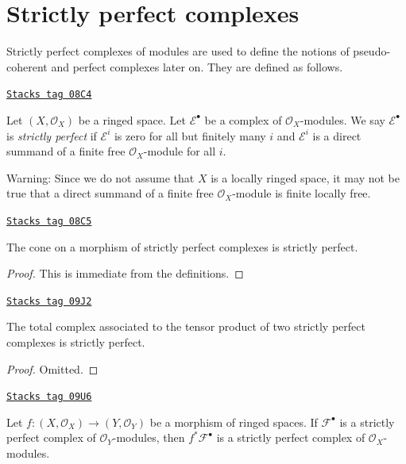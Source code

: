 \section{Strictly perfect complexes}
\label{cohomology-section-strictly-perfect}
Strictly perfect complexes of modules are used to define the notions
of pseudo-coherent and perfect complexes later on. They are defined
as follows.

\begin{definition}
\label{cohomology-definition-strictly-perfect}
\href{https://stacks.math.columbia.edu/tag/08C4}{\texttt{Stacks tag 08C4}}

Let $(X, \mathcal{O}_X)$ be a ringed space.
Let $\mathcal{E}^\bullet$ be a complex of $\mathcal{O}_X$-modules.
We say $\mathcal{E}^\bullet$ is {\it strictly perfect}
if $\mathcal{E}^i$ is zero for all but finitely many $i$ and
$\mathcal{E}^i$ is a direct summand of a finite free
$\mathcal{O}_X$-module for all $i$.
\end{definition}

Warning: Since we do not assume that $X$ is a locally ringed space,
it may not be true that a direct summand of a finite free
$\mathcal{O}_X$-module is finite locally free.

\begin{lemma}[Cone]
\label{cohomology-lemma-cone}
\href{https://stacks.math.columbia.edu/tag/08C5}{\texttt{Stacks tag 08C5}}

The cone on a morphism of strictly perfect complexes is
strictly perfect.
\end{lemma}

\begin{proof}
This is immediate from the definitions.
\end{proof}

\begin{lemma}[Tensor]
\label{cohomology-lemma-tensor}
\href{https://stacks.math.columbia.edu/tag/09J2}{\texttt{Stacks tag 09J2}}

The total complex associated to the tensor product of two
strictly perfect complexes is strictly perfect.
\end{lemma}

\begin{proof}
Omitted.
\end{proof}

\begin{lemma}
\label{cohomology-lemma-strictly-perfect-pullback}
\href{https://stacks.math.columbia.edu/tag/09U6}{\texttt{Stacks tag 09U6}}

Let $f : (X, \mathcal{O}_X) \to (Y, \mathcal{O}_Y)$
be a morphism of ringed spaces. If $\mathcal{F}^\bullet$ is a strictly
perfect complex of $\mathcal{O}_Y$-modules, then
$f^*\mathcal{F}^\bullet$ is a strictly perfect complex of
$\mathcal{O}_X$-modules.
\end{lemma}

